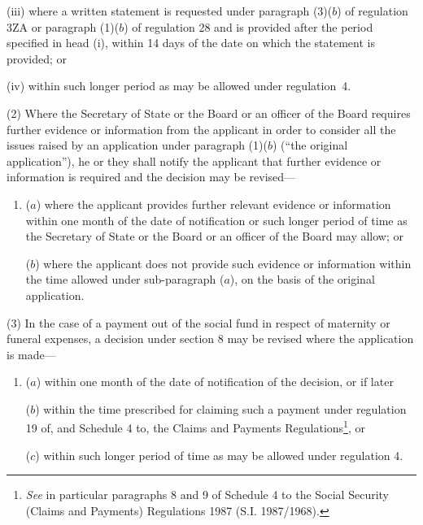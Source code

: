 \documentclass[12pt,a4paper]{article}
\begin{document}
\begin{enumerate}
\begin{enumerate}
(iii) where a written statement is requested under 
paragraph (3)($b$)  of regulation 3ZA or  %
paragraph (1)($b$)  of regulation 28 and is provided after the period specified in head (i), within 14 days of the date on which the statement is provided; or

(iv) within such longer period as may be allowed under regulation~4.
\end{enumerate}
\end{enumerate}

(2) Where the Secretary of State 
or the Board or an officer of the Board  %
requires further evidence or information from the applicant in order to consider all the issues raised by an application under paragraph (1)($b$) (“the original application”), he 
or they  %
shall notify the applicant that further evidence or information is required and the decision may be revised—
\begin{enumerate}\item[]
($a$) where the applicant provides further relevant evidence or information within one month of the date of notification or such longer period of time as the Secretary of State 
or the Board or an officer of the Board  %
may allow; or

($b$) where the applicant does not provide such evidence or information within the time allowed under sub-paragraph ($a$), on the basis of the original application.
\end{enumerate}

(3) In the case of a payment out of the social fund in respect of maternity or funeral expenses, a decision under section 8 may be revised where the application is made—
\begin{enumerate}\item[]
($a$) within one month of the date of notification of the decision, or if later

($b$) within the time prescribed for claiming such a payment under regulation 19 of, and Schedule 4 to, the Claims and Payments Regulations\footnote{\frenchspacing \emph{See} in particular paragraphs 8 and 9 of Schedule 4 to the Social Security (Claims and Payments) Regulations 1987 (S.I. 1987/1968).}, or

($c$) within such longer period of time as may be allowed under regulation 4.
\end{enumerate}
\end{document}
